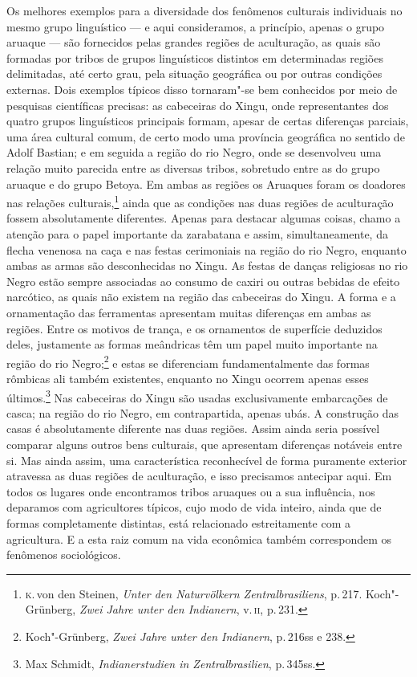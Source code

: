 Os melhores exemplos para a diversidade dos fenômenos culturais
individuais no mesmo grupo linguístico --- e aqui consideramos, a
princípio, apenas o grupo aruaque --- são fornecidos pelas grandes
regiões de aculturação, as quais são formadas por tribos de grupos
linguísticos distintos em determinadas regiões delimitadas, até certo
grau, pela situação geográfica ou por outras condições externas. Dois
exemplos típicos disso tornaram"-se bem conhecidos por meio de pesquisas
científicas precisas: as cabeceiras do Xingu, onde representantes dos
quatro grupos linguísticos principais formam, apesar de certas
diferenças parciais, uma área cultural comum, de certo modo uma
província geográfica no sentido de Adolf Bastian; e em seguida a
região do rio Negro, onde se desenvolveu uma relação muito parecida
entre as diversas tribos, sobretudo entre as do grupo aruaque e do grupo
Betoya. Em ambas as regiões os Aruaques foram os doadores nas relações
culturais,\footnote{\textsc{k}.\,von den Steinen, \textit{Unter den Naturvölkern
  Zentralbrasiliens}, p.\,217. Koch"-Grünberg, \textit{Zwei Jahre
  unter den Indianern}, v.\,\textsc{ii}, p.\,231.} ainda que as condições
nas duas regiões de aculturação fossem absolutamente diferentes.
Apenas para destacar algumas coisas, chamo a atenção para o papel
importante da zarabatana e assim, simultaneamente, da flecha venenosa na
caça e nas festas cerimoniais na região do rio Negro, enquanto ambas as
armas são desconhecidas no Xingu. As festas de danças religiosas no rio
Negro estão sempre associadas ao consumo de caxiri ou outras bebidas de
efeito narcótico, as quais não existem na região das cabeceiras do
Xingu. A forma e a ornamentação das ferramentas apresentam muitas
diferenças em ambas as regiões. Entre os motivos de trança, e os
ornamentos de superfície deduzidos deles, justamente as formas
meândricas têm um papel muito importante na região do rio
Negro;\footnote{Koch"-Grünberg, \textit{Zwei Jahre unter den Indianern}, 
p.\,216ss e 238.} e estas se diferenciam fundamentalmente das
formas rômbicas ali também existentes, enquanto no Xingu ocorrem apenas
esses últimos.\footnote{Max Schmidt, \textit{Indianerstudien in
  Zentralbrasilien}, p.\,345ss.} Nas cabeceiras do Xingu são
usadas exclusivamente embarcações de casca; na região do rio Negro, em
contrapartida, apenas ubás. A construção das casas é absolutamente
diferente nas duas regiões. Assim ainda seria possível comparar alguns
outros bens culturais, que apresentam diferenças notáveis entre si. Mas
ainda assim, uma característica reconhecível de forma puramente exterior
atravessa as duas regiões de aculturação, e isso precisamos antecipar
aqui. Em todos os lugares onde encontramos tribos aruaques ou a sua
influência, nos deparamos com agricultores típicos, cujo modo de vida
inteiro, ainda que de formas completamente distintas, está relacionado
estreitamente com a agricultura. E a esta raiz comum na vida econômica
também correspondem os fenômenos sociológicos.

